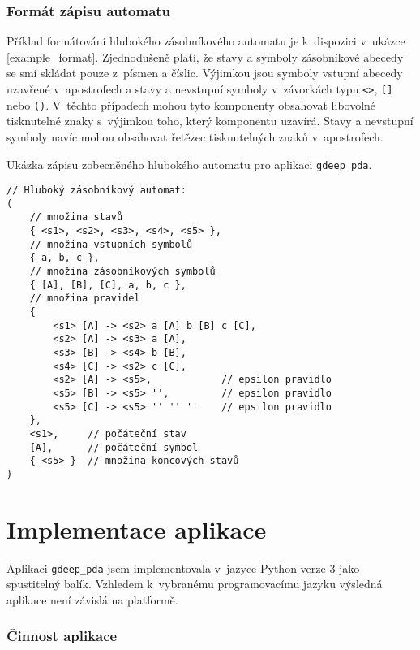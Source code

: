 \subsubsection{Formát zápisu automatu}\label{kap_aplikace_format}

Příklad formátování hlubokého zásobníkového automatu je k~dispozici v~ukázce \ref{example_format}. Zjednodušeně platí, že
stavy a symboly zásobníkové abecedy se smí skládat pouze z~písmen a číslic. Výjimkou jsou symboly vstupní abecedy uzavřené v~apostrofech a stavy a nevstupní symboly v~závorkách typu \texttt{<>}, \texttt{[]} nebo \texttt{()}. V~těchto případech mohou tyto komponenty obsahovat libovolné tisknutelné znaky s~výjimkou toho, který komponentu uzavírá. Stavy a nevstupní symboly navíc mohou obsahovat řetězec tisknutelných znaků v~apostrofech.


\begin{Example} \label{example_format}
Ukázka zápisu zobecněného hlubokého automatu pro aplikaci \texttt{gdeep\_pda}.

\begin{verbatim}
// Hluboký zásobníkový automat:
(
    // množina stavů
    { <s1>, <s2>, <s3>, <s4>, <s5> },
    // množina vstupních symbolů
    { a, b, c },
    // množina zásobníkových symbolů
    { [A], [B], [C], a, b, c },
    // množina pravidel
    { 
        <s1> [A] -> <s2> a [A] b [B] c [C],
        <s2> [A] -> <s3> a [A],
        <s3> [B] -> <s4> b [B],
        <s4> [C] -> <s2> c [C],
        <s2> [A] -> <s5>,            // epsilon pravidlo
        <s5> [B] -> <s5> '',         // epsilon pravidlo
        <s5> [C] -> <s5> '' '' ''    // epsilon pravidlo
    },
    <s1>,     // počáteční stav
    [A],      // počáteční symbol
    { <s5> }  // množina koncových stavů	
)
\end{verbatim}
\end{Example}

\section{Implementace aplikace}

Aplikaci \texttt{gdeep\_pda} jsem implementovala v~jazyce Python verze 3 jako spustitelný balík. Vzhledem k~vybranému programovacímu jazyku výsledná aplikace není závislá na platformě.


\subsubsection{Činnost aplikace}

